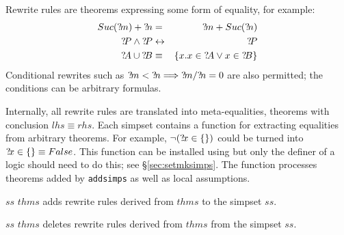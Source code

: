  Rewrite rules are theorems expressing some
form of equality, for example:
\begin{eqnarray*}
  Suc(\Var{m}) + \Var{n} &=&      \Var{m} + Suc(\Var{n}) \\
  \Var{P}\conj\Var{P}    &\bimp&  \Var{P} \\
  \Var{A} \un \Var{B} &\equiv& \{x.x\in \Var{A} \disj x\in \Var{B}\}
\end{eqnarray*}
Conditional rewrites such as ${?\!m}<{?\!n} \Longrightarrow {?\!m}/{?\!n} =
0$ are also permitted; the conditions can be arbitrary formulas.

Internally, all rewrite rules are translated into meta-equalities,
theorems with conclusion $lhs \equiv rhs$.  Each simpset contains a
function for extracting equalities from arbitrary theorems.  For
example, $\neg({?\!x}\in \{\})$ could be turned into ${?\!x}\in \{\}
\equiv False$.  This function can be installed using
 but only the definer of a logic should need to do
this; see {\S}\ref{sec:setmksimps}.  The function processes theorems
added by \texttt{addsimps} as well as local assumptions.

\begin{ttdescription}
  
\item[$ss$ \ttindexbold{addsimps} $thms$] adds rewrite rules derived
  from $thms$ to the simpset $ss$.
  
\item[$ss$ \ttindexbold{delsimps} $thms$] deletes rewrite rules
  derived from $thms$ from the simpset $ss$.

\end{ttdescription}

